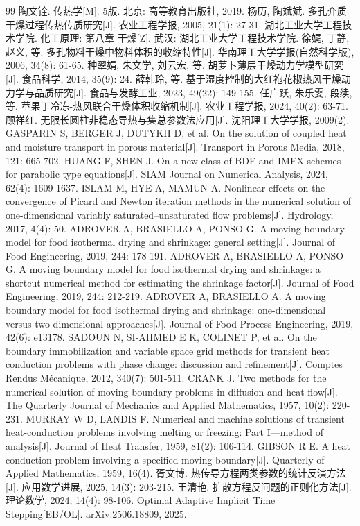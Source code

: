 \begin{thebibliography}{99}
 陶文铨. 传热学[M]. 5版. 北京: 高等教育出版社, 2019.
 杨历, 陶斌斌. 多孔介质干燥过程传热传质研究[J]. 农业工程学报, 2005, 21(1): 27-31.
 湖北工业大学工程技术学院. 化工原理: 第八章 干燥[Z]. 武汉: 湖北工业大学工程技术学院.
 徐娓, 丁静, 赵义, 等. 多孔物料干燥中物料体积的收缩特性[J]. 华南理工大学学报(自然科学版), 2006, 34(8): 61-65.
 种翠娟, 朱文学, 刘云宏, 等. 胡萝卜薄层干燥动力学模型研究[J]. 食品科学, 2014, 35(9): 24.
 薛韩玲, 等. 基于湿度控制的大红袍花椒热风干燥动力学与品质研究[J]. 食品与发酵工业, 2023, 49(22): 149-155.
 任广跃, 朱乐雯, 段续, 等. 苹果丁冷冻-热风联合干燥体积收缩机制[J]. 农业工程学报, 2024, 40(2): 63-71.
 顾祥红. 无限长圆柱非稳态导热与集总参数法应用[J]. 沈阳理工大学学报, 2009(2).
 GASPARIN S, BERGER J, DUTYKH D, et al. On the solution of coupled heat and moisture transport in porous material[J]. Transport in Porous Media, 2018, 121: 665-702.
 HUANG F, SHEN J. On a new class of BDF and IMEX schemes for parabolic type equations[J]. SIAM Journal on Numerical Analysis, 2024, 62(4): 1609-1637.
 ISLAM M, HYE A, MAMUN A. Nonlinear effects on the convergence of Picard and Newton iteration methods in the numerical solution of one-dimensional variably saturated–unsaturated flow problems[J]. Hydrology, 2017, 4(4): 50.
 ADROVER A, BRASIELLO A, PONSO G. A moving boundary model for food isothermal drying and shrinkage: general setting[J]. Journal of Food Engineering, 2019, 244: 178-191.
 ADROVER A, BRASIELLO A, PONSO G. A moving boundary model for food isothermal drying and shrinkage: a shortcut numerical method for estimating the shrinkage factor[J]. Journal of Food Engineering, 2019, 244: 212-219.
 ADROVER A, BRASIELLO A. A moving boundary model for food isothermal drying and shrinkage: one-dimensional versus two-dimensional approaches[J]. Journal of Food Process Engineering, 2019, 42(6): e13178.
 SADOUN N, SI-AHMED E K, COLINET P, et al. On the boundary immobilization and variable space grid methods for transient heat conduction problems with phase change: discussion and refinement[J]. Comptes Rendus Mécanique, 2012, 340(7): 501-511.
 CRANK J. Two methods for the numerical solution of moving-boundary problems in diffusion and heat flow[J]. The Quarterly Journal of Mechanics and Applied Mathematics, 1957, 10(2): 220-231.
 MURRAY W D, LANDIS F. Numerical and machine solutions of transient heat-conduction problems involving melting or freezing: Part I—method of analysis[J]. Journal of Heat Transfer, 1959, 81(2): 106-114.
 GIBSON R E. A heat conduction problem involving a specified moving boundary[J]. Quarterly of Applied Mathematics, 1959, 16(4).
 胥文博. 热传导方程两类参数的统计反演方法[J]. 应用数学进展, 2025, 14(3): 203-215.
 王清艳. 扩散方程反问题的正则化方法[J]. 理论数学, 2024, 14(4): 98-106.
 Optimal Adaptive Implicit Time Stepping[EB/OL]. arXiv:2506.18809, 2025.
\end{thebibliography}
